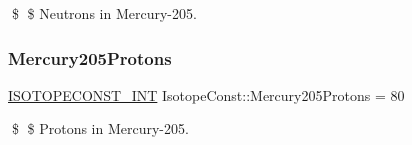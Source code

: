 \$ \$ Neutrons in Mercury-\/205. \mbox{\label{group___isotope_const-_mercury-_hg205_ga27ee2c4b8b88401e30579c11ce46e0c6}} 
\subsubsection{\texorpdfstring{Mercury205\+Protons}{Mercury205Protons}}
{\footnotesize\ttfamily \mbox{\hyperlink{group___isotope_const-_macros_ga5f18360b3e99483a35c32d789e62621c}{I\+S\+O\+T\+O\+P\+E\+C\+O\+N\+S\+T\+\_\+\+I\+NT}} Isotope\+Const\+::\+Mercury205\+Protons = 80}

\$ \$ Protons in Mercury-\/205. 